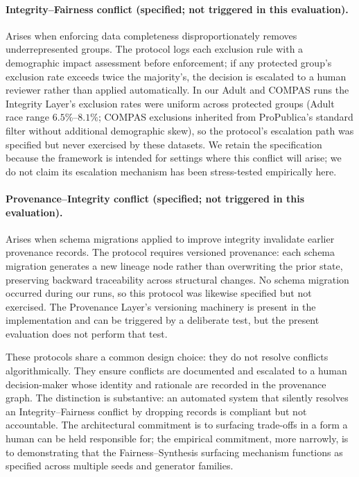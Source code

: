 \documentclass[11pt]{article}
\begin{document}
\paragraph{Integrity--Fairness conflict (specified; not triggered in this evaluation).} Arises when enforcing data completeness disproportionately removes underrepresented groups. The protocol logs each exclusion rule with a demographic impact assessment before enforcement; if any protected group's exclusion rate exceeds twice the majority's, the decision is escalated to a human reviewer rather than applied automatically. In our Adult and COMPAS runs the Integrity Layer's exclusion rates were uniform across protected groups (Adult race range $6.5\%$--$8.1\%$; COMPAS exclusions inherited from ProPublica's standard filter without additional demographic skew), so the protocol's escalation path was specified but never exercised by these datasets. We retain the specification because the framework is intended for settings where this conflict will arise; we do not claim its escalation mechanism has been stress-tested empirically here.

\paragraph{Provenance--Integrity conflict (specified; not triggered in this evaluation).} Arises when schema migrations applied to improve integrity invalidate earlier provenance records. The protocol requires versioned provenance: each schema migration generates a new lineage node rather than overwriting the prior state, preserving backward traceability across structural changes. No schema migration occurred during our runs, so this protocol was likewise specified but not exercised. The Provenance Layer's versioning machinery is present in the implementation and can be triggered by a deliberate test, but the present evaluation does not perform that test.

These protocols share a common design choice: they do not resolve conflicts algorithmically. They ensure conflicts are documented and escalated to a human decision-maker whose identity and rationale are recorded in the provenance graph. The distinction is substantive: an automated system that silently resolves an Integrity--Fairness conflict by dropping records is compliant but not accountable. The architectural commitment is to surfacing trade-offs in a form a human can be held responsible for; the empirical commitment, more narrowly, is to demonstrating that the Fairness--Synthesis surfacing mechanism functions as specified across multiple seeds and generator families.
\end{document}
